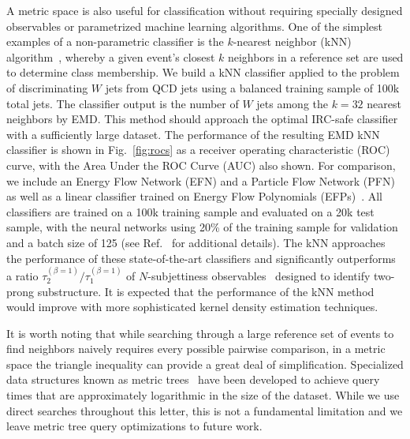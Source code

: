 \documentclass[aps,prl,twocolumn,preprintnumbers,nofootinbib,longbibliography,floatfix]{revtex4-1}
\DeclareRobustCommand{\Fig}[1]{Fig.~\ref{#1}}
\DeclareRobustCommand{\Ref}[1]{Ref.~\cite{#1}}
\begin{document}
A metric space is also useful for classification without requiring specially designed observables or parametrized machine learning algorithms.
%
One of the simplest examples of a non-parametric classifier is the $k$-nearest neighbor (kNN) algorithm~\cite{DBLP:journals/tit/CoverH67}, whereby a given event's closest $k$ neighbors in a reference set are used to determine class membership.
%
We build a kNN classifier applied to the problem of discriminating $W$ jets from QCD jets using a balanced training sample of 100k total jets.
%
The classifier output is the number of $W$ jets among the $k=32$ nearest neighbors by EMD.
%
This method should approach the optimal IRC-safe classifier with a sufficiently large dataset.
%
The performance of the resulting EMD kNN classifier is shown in \Fig{fig:rocs} as a receiver operating characteristic (ROC) curve, with the Area Under the ROC Curve (AUC) also shown.
%
For comparison, we include an Energy Flow Network (EFN) and a Particle Flow Network (PFN)~\cite{Komiske:2018cqr} as well as a linear classifier trained on Energy Flow Polynomials (EFPs)~\cite{Komiske:2017aww}.
%
All classifiers are trained on a 100k training sample and evaluated on a 20k test sample, with the neural networks using 20\% of the training sample for validation and a batch size of 125 (see \Ref{Komiske:2018cqr} for additional details).
%
The kNN approaches the performance of these state-of-the-art classifiers and significantly outperforms a ratio $\tau_2^{(\beta=1)}/\tau_1^{(\beta=1)}$ of $N$-subjettiness observables~\cite{Thaler:2010tr,Thaler:2011gf} designed to identify two-prong substructure.
%
It is expected that the performance of the kNN method would improve with more sophisticated kernel density estimation techniques.


It is worth noting that while searching through a large reference set of events to find neighbors naively requires every possible pairwise comparison, in a metric space the triangle inequality can provide a great deal of simplification.
%
Specialized data structures known as metric trees~\cite{DBLP:journals/ipl/Uhlmann91,DBLP:conf/soda/Yianilos93,DBLP:conf/vldb/Brin95,DBLP:journals/tods/BozkayaO99} have been developed to achieve query times that are approximately logarithmic in the size of the dataset.
%
While we use direct searches throughout this letter, this is not a fundamental limitation and we leave metric tree query optimizations to future work.
\end{document}
